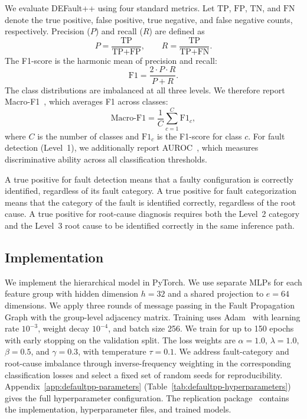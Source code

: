 We evaluate DEFault++ using four standard metrics. Let $\text{TP}$, $\text{FP}$, $\text{TN}$, and $\text{FN}$ denote the true positive, false positive, true negative, and false negative counts, respectively. Precision ($P$) and recall ($R$) are defined as
\begin{equation}
P = \frac{\text{TP}}{\text{TP} + \text{FP}}, \qquad R = \frac{\text{TP}}{\text{TP} + \text{FN}}.
\label{eq:prec_recall}
\end{equation}
The F1-score is the harmonic mean of precision and recall:
\begin{equation}
\text{F1} = \frac{2 \cdot P \cdot R}{P + R}.
\label{eq:f1}
\end{equation}
The class distributions are imbalanced at all three levels. We therefore report Macro-F1~\cite{naidu2023review}, which averages F1 across classes:
\begin{equation}
\text{Macro-F1} = \frac{1}{C} \sum_{c=1}^{C} \text{F1}_c,
\label{eq:macro_f1}
\end{equation}
where $C$ is the number of classes and $\text{F1}_c$ is the F1-score for class $c$. For fault detection (Level~1), we additionally report AUROC~\cite{bradley1997use}, which measures discriminative ability across all classification thresholds.

A true positive for fault detection means that a faulty configuration is correctly identified, regardless of its fault category. A true positive for fault categorization means that the category of the fault is identified correctly, regardless of the root cause. A true positive for root-cause diagnosis requires both the Level~2 category and the Level~3 root cause to be identified correctly in the same inference path.

\subsection{Implementation}

We implement the hierarchical model in PyTorch. We use separate MLPs for each feature group with hidden dimension $h = 32$ and a shared projection to $e = 64$ dimensions. We apply three rounds of message passing in the Fault Propagation Graph with the group-level adjacency matrix. Training uses Adam~\cite{kingma2015adam} with learning rate $10^{-3}$, weight decay $10^{-4}$, and batch size 256. We train for up to 150 epochs with early stopping on the validation split. The loss weights are $\alpha = 1.0$, $\lambda = 1.0$, $\beta = 0.5$, and $\gamma = 0.3$, with temperature $\tau = 0.1$. We address fault-category and root-cause imbalance through inverse-frequency weighting in the corresponding classification losses and select a fixed set of random seeds for reproducibility. Appendix~\ref{app:defaultpp-parameters} (Table~\ref{tab:defaultpp-hyperparameters}) gives the full hyperparameter configuration. The replication package~\cite{defaultpp_repo} contains the implementation, hyperparameter files, and trained models.

